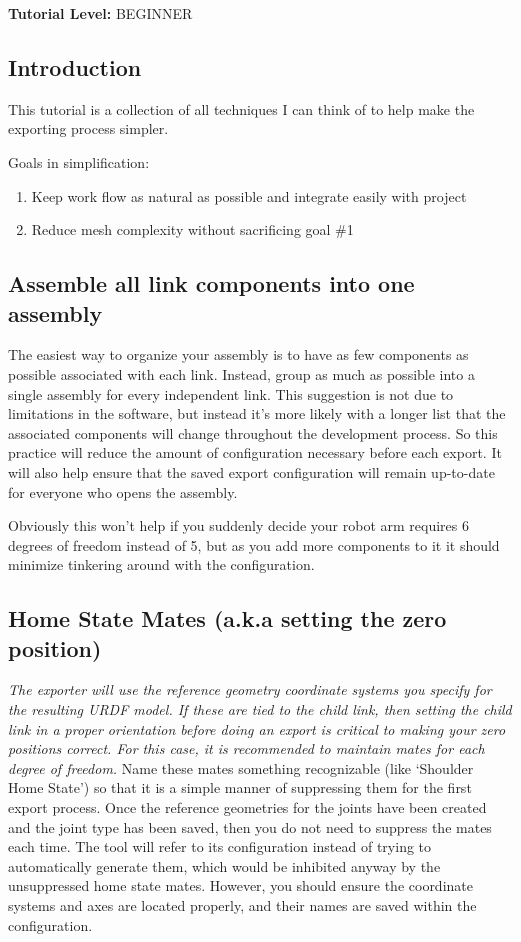 \noindent \textbf{Tutorial Level:} BEGINNER
\subsection{Introduction}
\noindent This tutorial is a collection of all techniques I can think of to help make the exporting process simpler.
 
\noindent Goals in simplification: 
\begin{enumerate}
\item Keep work flow as natural as possible and integrate easily with project 
\item Reduce mesh complexity without sacrificing goal \#1 
\end{enumerate}

\subsection{Assemble all link components into one assembly}
The easiest way to organize your assembly is to have as few components as possible associated with each link. Instead, group as much as possible into a single assembly for every independent link. This suggestion is not due to limitations in the software, but instead it's more likely with a longer list that the associated components will change throughout the development process. So this practice will reduce the amount of configuration necessary before each export. It will also help ensure that the saved export configuration will remain up-to-date for everyone who opens the assembly. 

Obviously this won't help if you suddenly decide your robot arm requires 6 degrees of freedom instead of 5, but as you add more components to it it should minimize tinkering around with the configuration.

\subsection{Home State Mates (a.k.a setting the zero position)}\label{sec:ExportHomeState}
\emph{The exporter will use the reference geometry coordinate systems you specify for the resulting URDF model.  If these are tied to the child link, then setting the child link in a proper orientation before doing an export is critical to making your zero positions correct.  For this case, it is recommended to maintain mates for each degree of freedom.} Name these mates something recognizable (like `Shoulder Home State') so that it is a simple manner of suppressing them for the first export process. Once the reference geometries for the joints have been created and the joint type has been saved, then you do not need to suppress the mates each time. The tool will refer to its configuration instead of trying to automatically generate them, which would be inhibited anyway by the unsuppressed home state mates. However, you should ensure the coordinate systems and axes are located properly, and their names are saved within the configuration. 


